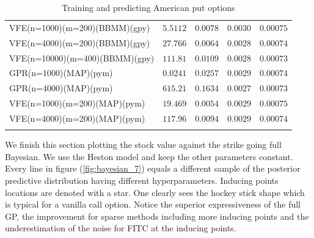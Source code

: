 \documentclass[12pt,a4paper,oneside]{book}
\begin{document}
\begin{table}
\begin{tabular}[t]{lcccc}
VFE(n=1000)(m=200)(BBMM)(gpy)  & $5.5112$ &  $0.0078$   & $0.0030$ &  $0.00075$ \\\addlinespace
VFE(n=4000)(m=200)(BBMM)(gpy)  & $27.766$ & $0.0064$    & $0.0028$  &    $0.00074$ \\\addlinespace
VFE(n=10000)(m=400)(BBMM)(gpy)  & $111.81$ & $0.0109$    & $0.0028$  &  $0.00073$ \\\addlinespace
GPR(n=1000)(MAP)(pym)  & $0.0241$ &  $0.0257$   & $0.0029$ &  $0.00074$ \\\addlinespace
GPR(n=4000)(MAP)(pym)  & $615.21$ & $0.1634$    & $\bm{0.0027}$ &  $\bm{0.00073}$  \\\addlinespace
VFE(n=1000)(m=200)(MAP)(pym)  & $19.469$  &  $0.0054$   & $0.0029$ &    $0.00075$ \\\addlinespace
VFE(n=4000)(m=200)(MAP)(pym)  & $117.96$ & $0.0094$    & $0.0029$ &     $0.00074$ \\\addlinespace
\\\bottomrule
\end{tabular}
\caption{Training and predicting American put options}\label{Result_American}
\end{table}

\clearpage

We finish this section plotting the stock value against the strike going full Bayesian. We use the Heston model and keep the other parameters constant. Every line in figure (\ref{fig:bayesian_7}) equals a different sample of the posterior predictive distribution having different hyperparameters. Inducing points locations are denoted with a star. One clearly sees the hockey stick shape which is typical for a vanilla call option. Notice the superior expressiveness of the full GP, the improvement for sparse methods including more inducing points and the underestimation of the noise for FITC at the inducing points.
\end{document}
